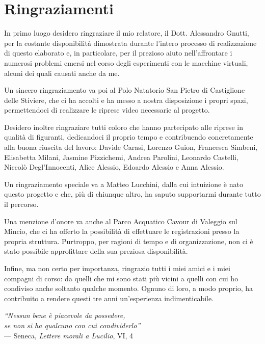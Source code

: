 \chapter*{Ringraziamenti}

In primo luogo desidero ringraziare il mio relatore, il Dott. Alessandro Gnutti, per la costante disponibilità dimostrata durante l'intero processo di realizzazione di questo elaborato e, in particolare, per il prezioso aiuto nell'affrontare i numerosi problemi emersi nel corso degli esperimenti con le macchine virtuali, alcuni dei quali causati anche da me.

Un sincero ringraziamento va poi al Polo Natatorio San Pietro di Castiglione delle Stiviere, che ci ha accolti e ha messo a nostra disposizione i propri spazi, permettendoci di realizzare le riprese video necessarie al progetto.

Desidero inoltre ringraziare tutti coloro che hanno partecipato alle riprese in qualità di figuranti, dedicandoci il proprio tempo e contribuendo concretamente alla buona riuscita del lavoro: Davide Carasi, Lorenzo Guion, Francesca Simbeni, Elisabetta Milani, Jasmine Pizzichemi, Andrea Parolini, Leonardo Castelli, Niccolò Degl'Innocenti, Alice Alessio, Edoardo Alessio e Anna Alessio.

Un ringraziamento speciale va a Matteo Lucchini, dalla cui intuizione è nato questo progetto e che, più di chiunque altro, ha saputo supportarmi durante tutto il percorso.

Una menzione d'onore va anche al Parco Acquatico Cavour di Valeggio sul Mincio, che ci ha offerto la possibilità di effettuare le registrazioni presso la propria struttura. Purtroppo, per ragioni di tempo e di organizzazione, non ci è stato possibile approfittare della sua preziosa disponibilità.

Infine, ma non certo per importanza, ringrazio tutti i miei amici e i miei compagni di corso: da quelli che mi sono stati più vicini a quelli con cui ho condiviso anche soltanto qualche momento. Ognuno di loro, a modo proprio, ha contribuito a rendere questi tre anni un'esperienza indimenticabile.

\vspace{1.5cm}
\begin{flushright}
    \emph{``Nessun bene è piacevole da possedere,\\
    se non si ha qualcuno con cui condividerlo''}\\[0.4em]
    --- Seneca, \emph{Lettere morali a Lucilio}, VI, 4
\end{flushright}
